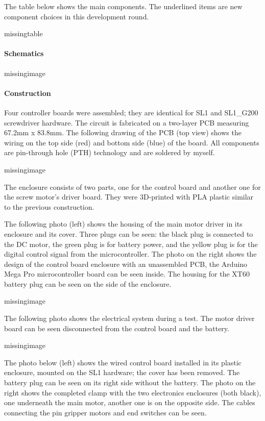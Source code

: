 The table below shows the main components. The underlined items are new component choices in this development round. 

missingtable

\paragraph{Schematics}

missingimage

\paragraph{Construction}
Four controller boards were assembled; they are identical for SL1 and SL1\_G200 screwdriver hardware. The circuit is fabricated on a two-layer PCB measuring 67.2mm x 83.8mm. The following drawing of the PCB (top view) shows the wiring on the top side (red) and bottom side (blue) of the board. All components are pin-through hole (PTH) technology and are soldered by myself.

missingimage

The enclosure consists of two parts, one for the control board and another one for the screw motor’s driver board. They were 3D-printed with PLA plastic similar to the previous construction. 

The following photo (left) shows the housing of the main motor driver in its enclosure and its cover. Three plugs can be seen: the black plug is connected to the DC motor, the green plug is for battery power, and the yellow plug is for the digital control signal from the microcontroller. The photo on the right shows the design of the control board enclosure with an unassembled PCB, the Arduino Mega Pro microcontroller board can be seen inside. The housing for the XT60 battery plug can be seen on the side of the enclosure. 

missingimage

The following photo shows the electrical system during a test. The motor driver board can be seen disconnected from the control board and the battery.

missingimage

The photo below (left) shows the wired control board installed in its plastic enclosure, mounted on the SL1 hardware; the cover has been removed. The battery plug can be seen on its right side without the battery. The photo on the right shows the completed clamp with the two electronics enclosures (both black), one underneath the main motor, another one is on the opposite side. The cables connecting the pin gripper motors and end switches can be seen.

